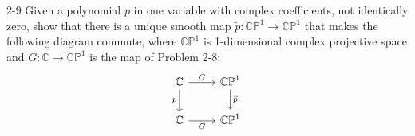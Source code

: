 \begin{problem}{2-9}
    Given a polynomial \( p \) in one variable with complex coefficients, not identically zero, show that there is a unique smooth map \( \widetilde{p}: \mathbb{CP}^{1} \to \mathbb{CP}^{1} \) that makes the following diagram commute, where \( \mathbb{CP}^{1} \) is 1-dimensional complex projective space and \( G: \mathbb{C} \to \mathbb{CP}^{1} \) is the map of Problem 2-8:
    \[\begin{tikzcd}
            {\mathbb{C}} & {\mathbb{CP}^{1}} \\
            {\mathbb{C}} & {\mathbb{CP}^{1}}
            \arrow["G", from=1-1, to=1-2] %
            \arrow["p"', from=1-1, to=2-1] %
            \arrow["{\widetilde{p}}", from=1-2, to=2-2] %
            \arrow["G"', from=2-1, to=2-2] %
        \end{tikzcd}\]
\end{problem}

